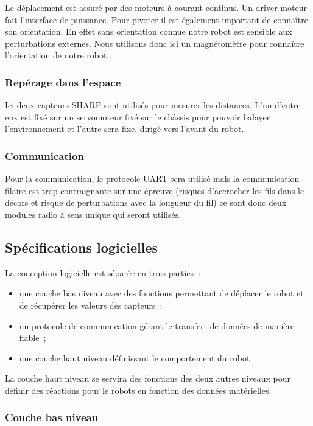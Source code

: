 \documentclass{article}
\begin{document}
Le déplacement est assuré par des moteurs à courant continus. Un driver moteur fait l'interface de puissance. Pour pivoter il est également important de connaître son orientation. En effet sans orientation connue notre robot est sensible aux perturbations externes. Nous utilisons donc ici un magnétomètre pour connaître l’orientation de notre robot.

\subsubsection{Repérage dans l'espace}

Ici deux capteurs SHARP sont utilisés pour mesurer les distances. L’un d’entre eux est fixé sur un servomoteur fixé sur le châssis pour pouvoir balayer l’environnement et l’autre sera fixe, dirigé vers l’avant du robot.

\subsubsection{Communication}

Pour la communication, le protocole UART sera utilisé mais la communication filaire est trop contraignante sur une épreuve (risques d’accrocher les fils dans le décors et risque de perturbations  avec la longueur du fil) ce sont donc deux modules radio à sens unique qui seront utilisés.

\subsection{Spécifications logicielles}

La conception logicielle est séparée en trois parties~: \\

\begin{itemize}
  \item une couche bas niveau avec des fonctions permettant de déplacer le robot et de récupérer les valeurs des capteurs~;
  \item un protocole de communication gérant le transfert de données de manière fiable~;
  \item une couche haut niveau définissant le comportement du robot.
\end{itemize}

La couche haut niveau se servira des fonctions des deux autres niveaux pour définir des réactions pour le robots en fonction des données matérielles.

\subsubsection{Couche bas niveau}
\end{document}
